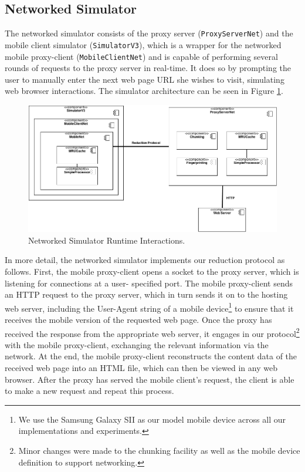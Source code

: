 \subsection{Networked Simulator}
\label{sec:netsim}
The networked simulator consists of the proxy server (\texttt{ProxyServerNet}) and the mobile client 
simulator (\texttt{SimulatorV3}), which is a wrapper for the 
networked mobile proxy-client (\texttt{MobileClientNet}) and is capable of performing several rounds 
of requests to the proxy server in real-time. It does so by prompting the user to manually enter the 
next web page URL she wishes to visit, simulating web browser interactions. The simulator architecture 
can be seen in Figure \ref{fig:netsim_arch}. 

\begin{figure}[ht]
\centering \includegraphics[width=\columnwidth]{images/component_diagram.png}
\caption{Networked Simulator Runtime Interactions.}
\label{fig:netsim_arch}
\end{figure}

In more detail, the networked simulator implements our reduction protocol as follows. First, the 
mobile proxy-client opens a socket to the proxy server, which is listening for connections at a user-
specified port. The mobile proxy-client sends an HTTP request to the proxy server, which in turn sends it on to the hosting web server, including the User-Agent string of a mobile device\footnote{We use the Samsung Galaxy SII as our model mobile device across all our implementations and experiments.} to ensure that it receives the mobile version of the requested web page. Once the proxy has received the response from the appropriate web server, it engages in our protocol\footnote{Minor changes were made to the chunking facility as well as the mobile device definition to support networking.} with the mobile proxy-client, exchanging the relevant information via the network. At the end, the mobile proxy-client reconstructs the content data of the received web page into an HTML file, which can then be viewed in any web browser. After the proxy has served the mobile client's request, the client is able to make a new request and repeat this process.

